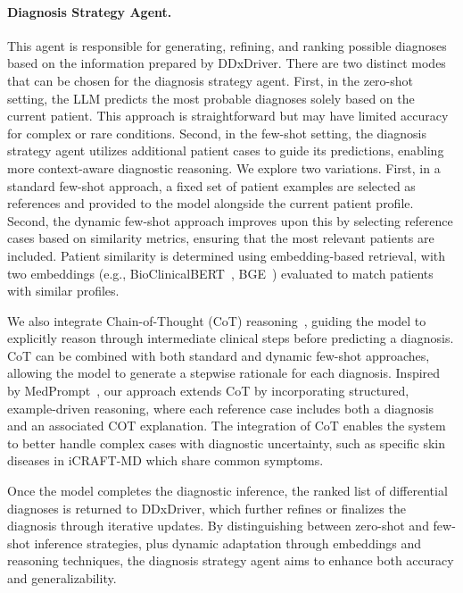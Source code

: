 \paragraph{Diagnosis Strategy Agent.}
This agent is responsible for generating, refining, and ranking possible diagnoses based on the information prepared by DDxDriver. %
There are two distinct modes that can be chosen for the diagnosis strategy agent. First, in the zero-shot setting, the LLM predicts the most probable diagnoses solely based on the current patient. This approach is straightforward but may have limited accuracy for complex or rare conditions. Second, in the few-shot setting, the diagnosis strategy agent utilizes additional patient cases to guide its predictions, enabling more context-aware diagnostic reasoning. We explore two variations. First, in a standard few-shot approach, a fixed set of patient examples are selected as references and provided to the model alongside the current patient profile. Second, the dynamic few-shot approach improves upon this by selecting reference cases based on similarity metrics, ensuring that the most relevant patients are included. Patient similarity is determined using embedding-based retrieval, with two embeddings (e.g., BioClinicalBERT~\citep{alsentzer-etal-2019-publicly}, BGE~\citep{xiao-etal-2024-bge}) evaluated to match patients with similar profiles.

We also integrate Chain-of-Thought (CoT) reasoning~\citep{wei2022chain}, guiding the model to explicitly reason through intermediate clinical steps before predicting a diagnosis. CoT can be combined with both standard and dynamic few-shot approaches, allowing the model to generate a stepwise rationale for each diagnosis. Inspired by MedPrompt~\citep{nori2023can}, our approach extends CoT by incorporating structured, example-driven reasoning, where each reference case includes both a diagnosis and an associated COT explanation. The integration of CoT enables the system to better handle complex cases with diagnostic uncertainty, such as specific skin diseases in iCRAFT-MD which share common symptoms. 

Once the model completes the diagnostic inference, the ranked list of differential diagnoses is returned to DDxDriver, which further refines or finalizes the diagnosis through iterative updates. By distinguishing between zero-shot and few-shot inference strategies, plus dynamic adaptation through embeddings and reasoning techniques, the diagnosis strategy agent aims to enhance both accuracy and generalizability.

